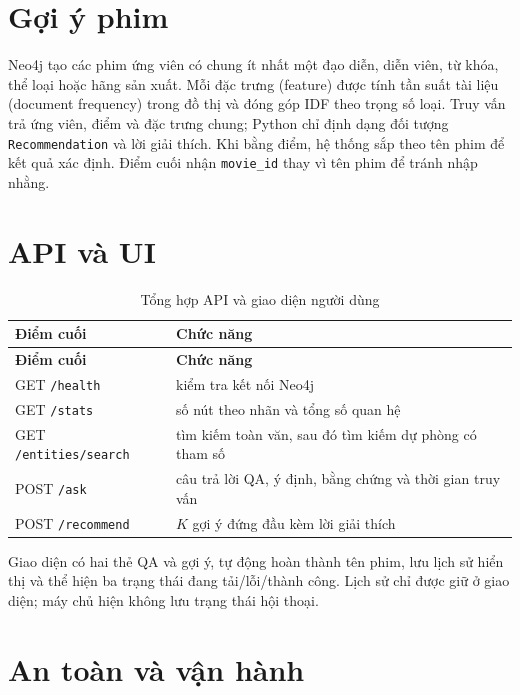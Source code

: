 \section{Gợi ý phim}

Neo4j tạo các phim ứng viên có chung ít nhất một đạo diễn, diễn viên, từ khóa,
thể loại hoặc hãng sản xuất. Mỗi đặc trưng (feature) được tính tần suất tài liệu
(document frequency) trong đồ thị và đóng góp IDF theo trọng số loại. Truy vấn trả
ứng viên, điểm và đặc trưng chung; Python chỉ định dạng đối tượng
\texttt{Recommendation} và lời giải thích. Khi bằng điểm, hệ thống sắp theo tên
phim để kết quả xác định. Điểm cuối nhận \texttt{movie\_id} thay vì tên phim để
tránh nhập nhằng.

\section{API và UI}

\begin{longtable}{|>{\raggedright\arraybackslash}p{}|>{\raggedright\arraybackslash}p{}|}
\caption{Tổng hợp API và giao diện người dùng}\label{tab:6-3} \\
\hline
\textbf{Điểm cuối} & \textbf{Chức năng} \\ \hline
\endfirsthead\hline \textbf{Điểm cuối} & \textbf{Chức năng} \\ \hline\endhead
GET \texttt{/health} & kiểm tra kết nối Neo4j \\ \hline
GET \texttt{/stats} & số nút theo nhãn và tổng số quan hệ \\ \hline
GET \texttt{/entities/search} & tìm kiếm toàn văn, sau đó tìm kiếm dự phòng có tham số \\ \hline
POST \texttt{/ask} & câu trả lời QA, ý định, bằng chứng và thời gian truy vấn \\ \hline
POST \texttt{/recommend} & $K$ gợi ý đứng đầu kèm lời giải thích \\ \hline
\end{longtable}

Giao diện có hai thẻ QA và gợi ý, tự động hoàn thành tên phim, lưu lịch sử hiển
thị và thể hiện ba trạng thái đang tải/lỗi/thành công. Lịch sử chỉ được giữ ở
giao diện; máy chủ hiện không lưu trạng thái hội thoại.

\section{An toàn và vận hành}

